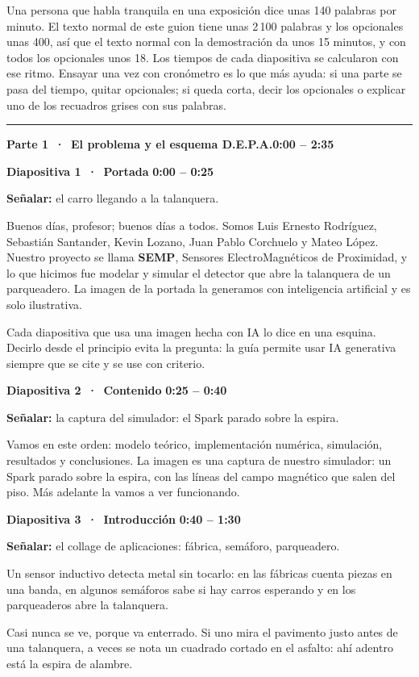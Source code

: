\documentclass[11pt,a4paper]{article}
\newcommand{\parte}[3]{%
  \clearpage
  {\color{AzulIcesi}\rule{\linewidth}{1.2pt}}\par\vspace{-2pt}
  {\Large\bfseries\color{AzulIcesi} Parte #1 \,·\, #2}\hfill{\large\bfseries #3}\par
  \vspace{2pt}}
\newcommand{\diapo}[3]{%
  \par\vspace{8pt}
  {\large\bfseries Diapositiva #1 \,·\, #2}\hfill{\normalsize\bfseries\color{AzulIcesi} #3}\par
  \vspace{1pt}}
\newcommand{\senala}[1]{{\small\color{AzulIcesi}\textbf{Señalar:} #1}\par}
\begin{document}
\begin{nota}[Ritmo]
Una persona que habla tranquila en una exposición dice unas 140 palabras por minuto. El texto normal de este guion
tiene unas 2\,100 palabras y los opcionales unas 400, así que el texto normal con la demostración da unos 15
minutos, y con todos los opcionales unos 18. Los tiempos de cada diapositiva se calcularon con ese ritmo. Ensayar una vez con cronómetro es lo que más ayuda: si una parte se pasa del tiempo, quitar opcionales;
si queda corta, decir los opcionales o explicar uno de los recuadros grises con sus palabras.
\end{nota}

\parte{1}{El problema y el esquema D.E.P.A.}{0:00 -- 2:35}

\diapo{1}{Portada}{0:00 -- 0:25}
\senala{el carro llegando a la talanquera.}

Buenos días, profesor; buenos días a todos. Somos Luis Ernesto Rodríguez, Sebastián Santander, Kevin Lozano,
Juan Pablo Corchuelo y Mateo López. Nuestro proyecto se llama \textbf{SEMP}, Sensores ElectroMagnéticos de
Proximidad, y lo que hicimos fue modelar y simular el detector que abre la talanquera de un parqueadero. La imagen
de la portada la generamos con inteligencia artificial y es solo ilustrativa.

\begin{nota}
Cada diapositiva que usa una imagen hecha con IA lo dice en una esquina. Decirlo desde el principio evita la
pregunta: la guía permite usar IA generativa siempre que se cite y se use con criterio.
\end{nota}

\diapo{2}{Contenido}{0:25 -- 0:40}
\senala{la captura del simulador: el Spark parado sobre la espira.}

Vamos en este orden: modelo teórico, implementación numérica, simulación, resultados y conclusiones. La imagen es
una captura de nuestro simulador: un Spark parado sobre la espira, con las líneas del campo magnético que salen del
piso. Más adelante la vamos a ver funcionando.

\diapo{3}{Introducción}{0:40 -- 1:30}
\senala{el collage de aplicaciones: fábrica, semáforo, parqueadero.}

Un sensor inductivo detecta metal sin tocarlo: en las fábricas cuenta piezas en una banda, en algunos semáforos
sabe si hay carros esperando y en los parqueaderos abre la talanquera.

\begin{opcional}
Casi nunca se ve, porque va enterrado. Si uno mira el pavimento justo antes de una talanquera, a veces se nota un
cuadrado cortado en el asfalto: ahí adentro está la espira de alambre.
\end{opcional}
\end{document}

